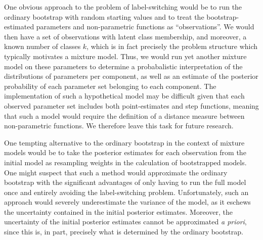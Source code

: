 \documentclass[10pt]{olplainarticle}\usepackage[]{graphicx}\usepackage[]{color}
\begin{document}
One obvious approach to the problem of label-switching would be to run the ordinary bootstrap with random starting values and to treat the bootstrap-estimated parameters and non-parametric functions as ``observations''. We would then have a set of observations with latent class membership, and moreover, a known number of classes $k$, which is in fact precisely the problem structure which typically motivates a mixture model. Thus, we would run yet another mixture model on these parameters to determine a probabalistic interpretation of the distributions of parameters per component, as well as an estimate of the posterior probability of each parameter set belonging to each component. The implementation of such a hypothetical model may be difficult given that each observed parameter set includes both point-estimates and step functions, meaning that such a model would require the definition of a distance measure between non-parametric functions. We therefore leave this task for future research.

One tempting alternative to the ordinary bootstrap in the context of mixture models would be to take the posterior estimates for each observation from the initial model as resampling weights in the calculation of bootstrapped models. One might suspect that such a method would approximate the ordinary bootstrap with the significant advantages of only having to run the full model once and entirely avoiding the label-switching problem. Unfortunately, such an approach would severely underestimate the variance of the model, as it eschews the uncertainty contained in the initial posterior estimates. Moreover, the uncertainty of the initial posterior estimates cannot be approximated \emph{a priori}, since this is, in part, precisely what is determined by the ordinary bootstrap.

% 
\end{document}
